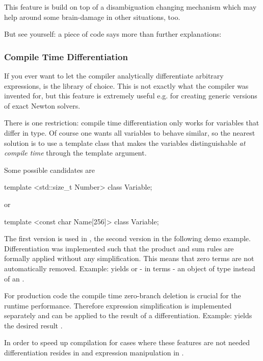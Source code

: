 This feature is build on top of a disambiguation changing mechanism
which may help around some brain-damage in other situations, too.

But see yourself: a piece of code says more than further explanations:



\subsubsection{Compile Time Differentiation}

If you ever want to let the compiler analytically differentiate arbitrary
expressions, \Daixtrose is the library of choice. This is not exactly what the
compiler was invented for, but this feature is extremely useful e.g. for
creating generic versions of exact Newton solvers.

There is one restriction: compile time differentiation only works for
variables that differ in type. Of course one wants all variables to behave
similar, so the nearest solution is to use a template class that makes
the variables distinguishable \emph{at compile time} through the template
argument.

Some possible candidates are
\begin{code}
  template <std::size_t Number> class Variable;
\end{code}
%
or
\begin{code}
  template <const char Name[256]> class Variable;
\end{code}

The first version is used in , the
second version in the following demo example. Differentiation was implemented
such that the product and sum rules are formally applied without any
simplification. This means that zero terms are not automatically removed.
Example:  yields  or - in \CC terms - an
object of type  instead of an
.

For production code the compile time zero-branch deletion is crucial for the
runtime performance. Therefore expression simplification is implemented
separately and can be applied to the result of a differentiation.  
Example:  yields the desired result .

In order to speed up compilation for cases where these features are not needed
differentiation resides in  and expression
manipulation in . 

